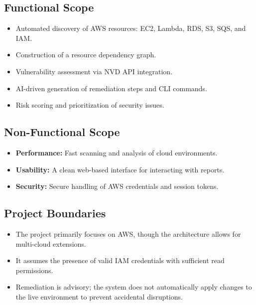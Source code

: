 \subsection{Functional Scope}
\begin{itemize}
	\item Automated discovery of AWS resources: EC2, Lambda, RDS, S3, SQS, and IAM.
	\item Construction of a resource dependency graph.
	\item Vulnerability assessment via NVD API integration.
	\item AI-driven generation of remediation steps and CLI commands.
	\item Risk scoring and prioritization of security issues.
\end{itemize}

\subsection{Non-Functional Scope}
\begin{itemize}
	\item \textbf{Performance:} Fast scanning and analysis of cloud environments.
	\item \textbf{Usability:} A clean web-based interface for interacting with reports.
	\item \textbf{Security:} Secure handling of AWS credentials and session tokens.
\end{itemize}

\subsection{Project Boundaries}
\begin{itemize}
	\item The project primarily focuses on AWS, though the architecture allows for multi-cloud extensions.
	\item It assumes the presence of valid IAM credentials with sufficient read permissions.
	\item Remediation is advisory; the system does not automatically apply changes to the live environment to prevent accidental disruptions.
\end{itemize}
